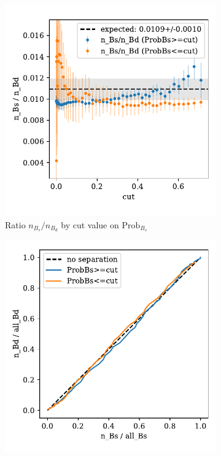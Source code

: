 \begin{figure}
    \centering
    \begin{subfigure}{0.5\textwidth}
        \centering
        \includegraphics[width=\textwidth]{images/data_ratio.pdf}
        \caption{Ratio $n_{B_s}/n_{B_d}$ by cut value on $\text{Prob}_{B_s}$}
        \label{fig:data_ratio}
    \end{subfigure}%
    \begin{subfigure}{0.5\textwidth}
        \centering
        \includegraphics[width=\textwidth]{images/data_roc.pdf}

\end{subfigure}
\end{figure}
